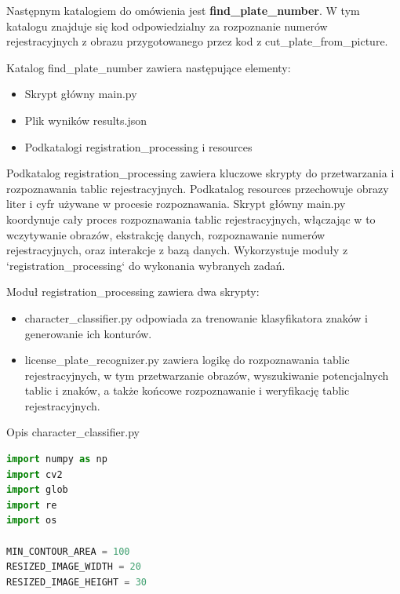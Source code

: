 \documentclass[12pt,a4paper,oneside]{article}
\theoremstyle{definition}
\numberwithin{equation}{section}
\begin{document}
\newpage






Następnym katalogiem do omówienia jest \textbf{find{\_}plate{\_}number}. W tym katalogu znajduje się kod odpowiedzialny za rozpoznanie numerów rejestracyjnych z obrazu przygotowanego przez kod z {cut{\_}plate{\_}from{\_}picture}. 

Katalog find{\_}plate{\_}number zawiera następujące elementy:

\begin{itemize}
  \item Skrypt główny main.py
  \item Plik wyników results.json
  \item Podkatalogi registration{\_}processing i resources
\end{itemize}



Podkatalog registration{\_}processing zawiera kluczowe skrypty do przetwarzania i rozpoznawania tablic rejestracyjnych. Podkatalog resources przechowuje obrazy liter i cyfr używane w procesie rozpoznawania.
Skrypt główny main.py koordynuje cały proces rozpoznawania tablic rejestracyjnych, włączając w to wczytywanie obrazów, ekstrakcję danych, rozpoznawanie numerów rejestracyjnych, oraz interakcje z bazą danych. Wykorzystuje moduły z `registration{\_}processing` do wykonania wybranych zadań.

Moduł registration{\_}processing zawiera dwa skrypty:

\begin{itemize}
  \item character{\_}classifier.py odpowiada za trenowanie klasyfikatora znaków i generowanie ich konturów.
  \item license{\_}plate{\_}recognizer.py zawiera logikę do rozpoznawania tablic rejestracyjnych, w tym przetwarzanie obrazów, wyszukiwanie potencjalnych tablic i znaków, a także końcowe rozpoznawanie i weryfikację tablic rejestracyjnych.
\end{itemize}

Opis character{\_}classifier.py

\begin{adjustbox}{max width=\textwidth}
\begin{lstlisting}[language=Python]
import numpy as np
import cv2
import glob
import re
import os

MIN_CONTOUR_AREA = 100
RESIZED_IMAGE_WIDTH = 20
RESIZED_IMAGE_HEIGHT = 30

\end{lstlisting} 
\end{adjustbox}
\end{document}
